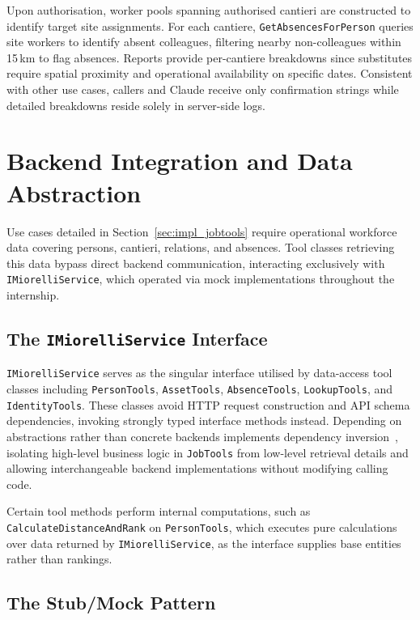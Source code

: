 Upon authorisation, worker pools spanning authorised cantieri are constructed to identify target site assignments. For each cantiere, \texttt{GetAbsencesForPerson} queries site workers to identify absent colleagues, filtering nearby non-colleagues within 15\,km to flag absences. Reports provide per-cantiere breakdowns since substitutes require spatial proximity and operational availability on specific dates. Consistent with other use cases, callers and Claude receive only confirmation strings while detailed breakdowns reside solely in server-side logs.

\section{Backend Integration and Data Abstraction}
\label{sec:impl_backend_integration}

Use cases detailed in Section~\ref{sec:impl_jobtools} require operational workforce data covering persons, cantieri, relations, and absences. Tool classes retrieving this data bypass direct backend communication, interacting exclusively with \texttt{IMiorelliService}, which operated via mock implementations throughout the internship.

\subsection{The \texttt{IMiorelliService} Interface}
\label{subsec:impl_miorelli_interface}

\texttt{IMiorelliService} serves as the singular interface utilised by data-access tool classes including \texttt{PersonTools}, \texttt{AssetTools}, \texttt{AbsenceTools}, \texttt{LookupTools}, and \texttt{IdentityTools}. These classes avoid HTTP request construction and API schema dependencies, invoking strongly typed interface methods instead. Depending on abstractions rather than concrete backends implements dependency inversion~\cite{martin1996dip}, isolating high-level business logic in \texttt{JobTools} from low-level retrieval details and allowing interchangeable backend implementations without modifying calling code.

Certain tool methods perform internal computations, such as \texttt{CalculateDistanceAndRank} on \texttt{PersonTools}, which executes pure calculations over data returned by \texttt{IMiorelliService}, as the interface supplies base entities rather than rankings.

\subsection{The Stub/Mock Pattern}
\label{subsec:impl_miorelli_stub}

